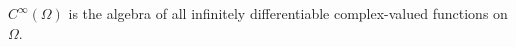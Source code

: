 
$C^\infty(\Omega)$ is the algebra of all infinitely differentiable complex-valued functions on $\Omega$.
